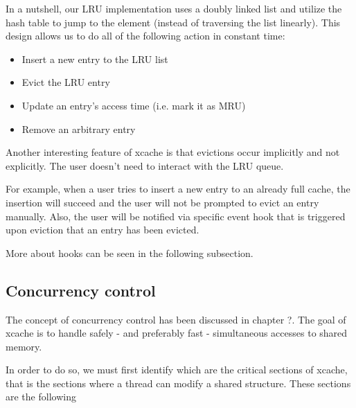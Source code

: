 
In a nutshell, our LRU implementation uses a doubly linked list and utilize the 
hash table to jump to the element (instead of traversing the list linearly).
This design allows us to do all of the following action in constant time:

\begin{itemize}
	\item Insert a new entry to the LRU list
	\item Evict the LRU entry
	\item Update an entry's access time (i.e. mark it as MRU)
	\item Remove an arbitrary entry
\end{itemize}

Another interesting feature of xcache is that evictions occur implicitly and not 
explicitly. The user doesn't need to interact with the LRU queue.

For example, when a user tries to insert a new entry to an already full cache, 
the insertion will succeed and the user will not be prompted to evict an entry 
manually. Also, the user will be notified via specific event hook that is 
triggered upon eviction that an entry has been evicted.

More about hooks can be seen in the following subsection.

\subsection{Concurrency control}

The concept of concurrency control has been discussed in chapter ?. The goal of 
xcache is to handle safely - and preferably fast - simultaneous accesses to 
shared memory.

In order to do so, we must first identify which are the critical sections of 
xcache, that is the sections where a thread can modify a shared structure. These 
sections are the following

